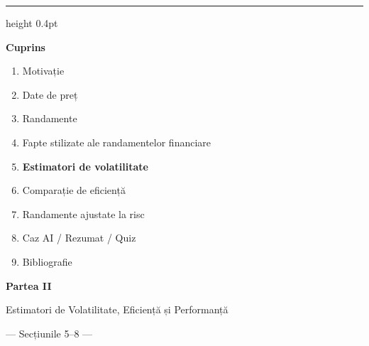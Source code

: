 \documentclass[9pt, aspectratio=169, t]{beamer}
\theoremstyle{definition}
\begin{document}

{
\begin{frame}{}
    {\color{FooterGray}\hrule height 0.4pt}
    \vspace{0.1cm}
    {\Large\textcolor{IDAred}{\textbf{Cuprins}}}
    \vspace{0.2cm}
    \begin{enumerate}
        \item Motivație \checkmark
        \item Date de preț \checkmark
        \item Randamente \checkmark
        \item Fapte stilizate ale randamentelor financiare \checkmark
        \item \textbf{Estimatori de volatilitate}
        \item Comparație de eficiență
        \item Randamente ajustate la risc
        \item Caz AI / Rezumat / Quiz
        \item Bibliografie
    \end{enumerate}
\end{frame}
}

{
\begin{frame}[plain]
\vfill
\begin{center}
{\Huge\textcolor{IDAred}{\textbf{Partea II}}}

\vspace{0.6cm}

{\Large\textcolor{MainBlue}{Estimatori de Volatilitate, Eficiență și Performanță}}

\vspace{0.4cm}

{\large\textcolor{MediumGray}{--- Secțiunile 5--8 ---}}
\end{center}
\vfill
\end{frame}
}
\end{document}
